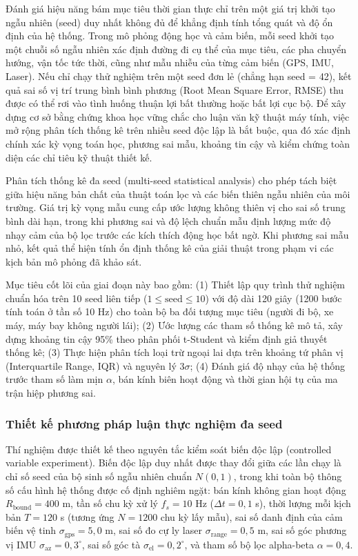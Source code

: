 \hspace{0.5cm} Đánh giá hiệu năng bám mục tiêu thời gian thực chỉ trên một giá trị khởi tạo ngẫu nhiên (seed) duy nhất không đủ để khẳng định tính tổng quát và độ ổn định của hệ thống. Trong mô phỏng động học và cảm biến, mỗi seed khởi tạo một chuỗi số ngẫu nhiên xác định đường đi cụ thể của mục tiêu, các pha chuyển hướng, vận tốc tức thời, cũng như mẫu nhiễu của từng cảm biến (GPS, IMU, Laser). Nếu chỉ chạy thử nghiệm trên một seed đơn lẻ (chẳng hạn seed = 42), kết quả sai số vị trí trung bình bình phương (Root Mean Square Error, RMSE) thu được có thể rơi vào tình huống thuận lợi bất thường hoặc bất lợi cục bộ. Để xây dựng cơ sở bằng chứng khoa học vững chắc cho luận văn kỹ thuật máy tính, việc mở rộng phân tích thống kê trên nhiều seed độc lập là bắt buộc, qua đó xác định chính xác kỳ vọng toán học, phương sai mẫu, khoảng tin cậy và kiểm chứng toàn diện các chỉ tiêu kỹ thuật thiết kế.

Phân tích thống kê đa seed (multi-seed statistical analysis) cho phép tách biệt giữa hiệu năng bản chất của thuật toán lọc và các biến thiên ngẫu nhiên của môi trường. Giá trị kỳ vọng mẫu cung cấp ước lượng không thiên vị cho sai số trung bình dài hạn, trong khi phương sai và độ lệch chuẩn mẫu định lượng mức độ nhạy cảm của bộ lọc trước các kích thích động học bất ngờ. Khi phương sai mẫu nhỏ, kết quả thể hiện tính ổn định thống kê của giải thuật trong phạm vi các kịch bản mô phỏng đã khảo sát.

Mục tiêu cốt lõi của giai đoạn này bao gồm: (1) Thiết lập quy trình thử nghiệm chuẩn hóa trên 10 seed liên tiếp ($1 \le \text{seed} \le 10$) với độ dài 120 giây (1200 bước tính toán ở tần số 10 Hz) cho toàn bộ ba đối tượng mục tiêu (người đi bộ, xe máy, máy bay không người lái); (2) Ước lượng các tham số thống kê mô tả, xây dựng khoảng tin cậy 95\% theo phân phối t-Student và kiểm định giả thuyết thống kê; (3) Thực hiện phân tích loại trừ ngoại lai dựa trên khoảng tứ phân vị (Interquartile Range, IQR) và nguyên lý $3\sigma$; (4) Đánh giá độ nhạy của hệ thống trước tham số làm mịn $\alpha$, bán kính biên hoạt động và thời gian hội tụ của ma trận hiệp phương sai.

\subsubsection{Thiết kế phương pháp luận thực nghiệm đa seed}

\hspace{0.5cm} Thí nghiệm được thiết kế theo nguyên tắc kiểm soát biến độc lập (controlled variable experiment). Biến độc lập duy nhất được thay đổi giữa các lần chạy là chỉ số seed của bộ sinh số ngẫu nhiên chuẩn $N(0, 1)$, trong khi toàn bộ thông số cấu hình hệ thống được cố định nghiêm ngặt: bán kính không gian hoạt động $R_{\text{bound}} = 400$ m, tần số chu kỳ xử lý $f_s = 10$ Hz ($\Delta t = 0{,}1$ s), thời lượng mỗi kịch bản $T = 120$ s (tương ứng $N = 1200$ chu kỳ lấy mẫu), sai số danh định của cảm biến vệ tinh $\sigma_{\text{gps}} = 5{,}0$ m, sai số đo cự ly laser $\sigma_{\text{range}} = 0{,}5$ m, sai số góc phương vị IMU $\sigma_{\text{az}} = 0{,}3^\circ$, sai số góc tà $\sigma_{\text{el}} = 0{,}2^\circ$, và tham số bộ lọc alpha-beta $\alpha = 0{,}4$.

